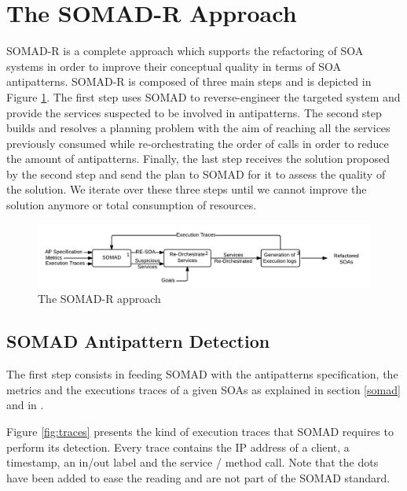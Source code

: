 \documentclass[lnbip]{svmultln}
\begin{document}
\section{The SOMAD-R Approach}

SOMAD-R is a complete approach which supports the refactoring of SOA systems in order to improve their conceptual quality in terms of SOA antipatterns. SOMAD-R is composed of three main steps and is depicted in Figure \ref{fig:appraoch}. The first step uses SOMAD to reverse-engineer the targeted system and provide the services suspected to be involved in antipatterns. The second step builds and resolves a planning problem with the aim of reaching all the services previously consumed while re-orchestrating the order of calls in order to reduce the amount of antipatterns. Finally, the last step receives the solution proposed by the second step and send the plan to SOMAD for it to assess the quality of the solution. We iterate over these three steps until we cannot improve the solution anymore or total consumption of resources.


\begin{figure}
    \centering
	\includegraphics[width=\textwidth]{approach.png}
 	\caption{The SOMAD-R approach}
    \label{fig:appraoch}
\end{figure}


\subsection{SOMAD Antipattern Detection}

The first step consists in feeding SOMAD with the antipatterns specification, the metrics and the executions traces of a given SOAs as explained in section \ref{somad} and in \cite{Nayrolles2013a}. 

Figure \ref{fig:traces} presents the kind of execution traces that SOMAD requires to perform its detection. Every trace contains the IP address of a client, a timestamp, an in/out label and the service / method call. Note that the dots have been added to ease the reading and are not part of the SOMAD standard. 
\end{document}

